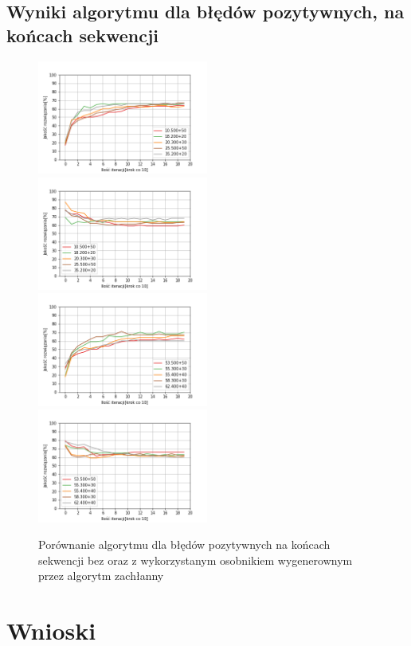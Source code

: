\documentclass{article}
\begin{document}
\subsection{Wyniki algorytmu dla błędów pozytywnych, na końcach sekwencji}
\begin{figure}[H]
\includegraphics[width=0.5\textwidth]{poz-oli1.png}
\includegraphics[width=0.5\textwidth]{poz-oli-greedy1.png}
\includegraphics[width=0.5\textwidth]{poz-oli2.png}
\includegraphics[width=0.5\textwidth]{poz-oli-greedy2.png}
\caption{Porównanie algorytmu dla błędów pozytywnych na końcach sekwencji bez oraz z wykorzystanym osobnikiem wygenerownym przez algorytm zachłanny}
\end{figure}
\section{Wnioski}
\end{document}
